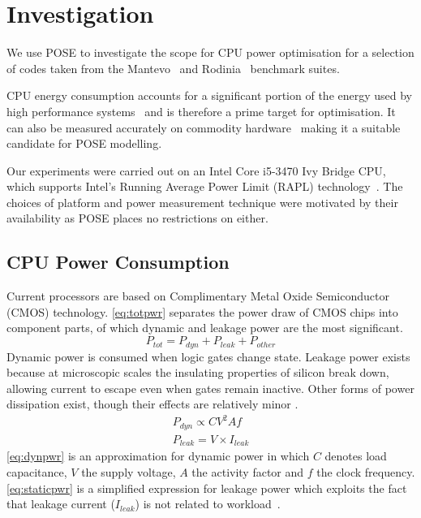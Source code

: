 \section{Investigation}
\label{sec:investigation}
\noindent
We use POSE to investigate the scope for CPU power optimisation for a selection of codes taken from the Mantevo~\cite{heroux:2009aa} and Rodinia~\cite{che:2009aa} benchmark suites.

CPU energy consumption accounts for a significant portion of the energy used by high performance systems~\cite{rong:2010aa} and is therefore a prime target for optimisation.
It can also be measured accurately on commodity hardware~\cite{hackenberg:2013aa} making it a suitable candidate for POSE modelling.

Our experiments were carried out on an Intel Core i5-3470 Ivy Bridge CPU, which supports Intel's Running Average Power Limit (RAPL) technology~\cite{david:2010aa}.
The choices of platform and power measurement technique were motivated by their availability as POSE places no restrictions on either.

\subsection{CPU Power Consumption}
\label{ssec:cpupower}
\noindent
Current processors are based on Complimentary Metal Oxide Semiconductor (CMOS) technology.
\autoref{eq:totpwr} separates the power draw of CMOS chips into component parts, of which dynamic and leakage power are the most significant.
\begin{equation}
\label{eq:totpwr}
P_{tot} = P_{dyn} + P_{leak} + P_{other}
\end{equation}
Dynamic power is consumed when logic gates change state.
Leakage power exists because at microscopic scales the insulating properties of silicon break down, allowing current to escape even when gates remain inactive.
Other forms of power dissipation exist, though their effects are relatively minor \cite{kaxiras:2008aa}.
\begin{gather}
P_{dyn} \propto CV^{2}Af \label{eq:dynpwr} \\
P_{leak} = V\times I_{leak} \label{eq:staticpwr}
\end{gather}
\autoref{eq:dynpwr} is an approximation for dynamic power in which $C$ denotes load capacitance, $V$ the supply voltage, $A$ the activity factor and $f$ the clock frequency.
\autoref{eq:staticpwr} is a simplified expression for leakage power which exploits the fact that leakage current ($I_{leak}$) is not related to workload~\cite{kim:2003aa}.

